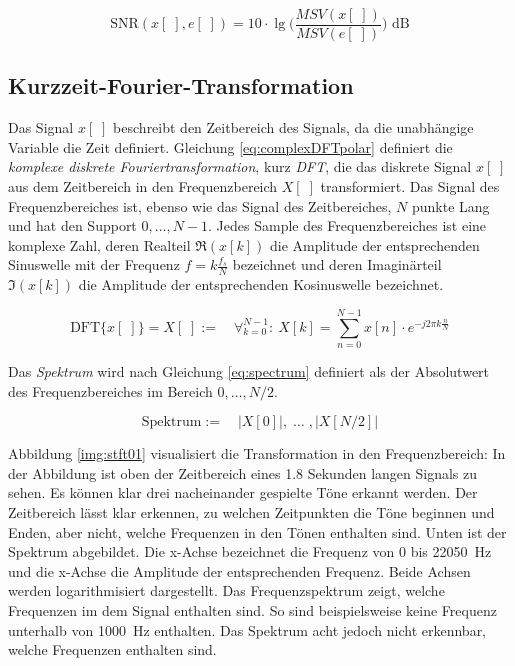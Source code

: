 \begin{equation}
\text{SNR}(x[\;],e[\;]) = 10 \cdot  \lg \Big(\frac{MSV(x[\;])}{MSV(e[\;])} \Big) \text{ dB}
\label{eq:snrDb}
\end{equation}

\subsection{Kurzzeit-Fourier-Transformation}
\label{sec:stft}

Das Signal $x[\;]$ beschreibt den Zeitbereich des Signals, da die unabhängige Variable die Zeit definiert. Gleichung \ref{eq:complexDFTpolar} definiert die \emph{komplexe diskrete Fouriertransformation}, kurz \emph{DFT}, die das diskrete Signal $x[\;]$ aus dem Zeitbereich in den Frequenzbereich $X[\;]$ transformiert. Das Signal des Frequenzbereiches ist, ebenso wie das Signal des Zeitbereiches, $N$ punkte Lang und hat den Support $0 , \ldots , N-1$. Jedes Sample des Frequenzbereiches ist eine komplexe Zahl, deren Realteil $\Re(x[k])$ die Amplitude der entsprechenden Sinuswelle mit der Frequenz $f = k\frac{f_s}{N}$ bezeichnet und deren Imaginärteil  $\Im(x[k])$ die Amplitude der entsprechenden Kosinuswelle bezeichnet.\cite[S. 149, S. 567 - 571]{dspGuide} \cite[S. 60]{sprachverarbeitung}

\begin{equation}
\label{eq:complexDFTpolar}
\text{DFT}\{x[\;]\} = X[\;]  := \quad \mathop{\forall}_{k = 0}^{N-1} :\ X[k] =  \sum_{n = 0}^{N-1}  x[n] \cdot e^{-j 2\pi k \frac{n}{N}}
\end{equation}

Das \emph{Spektrum} wird nach Gleichung \ref{eq:spectrum} definiert als der Absolutwert des Frequenzbereiches im Bereich $0, \ldots , N/2$.

\begin{equation}
\label{eq:spectrum}
\text{Spektrum} := \quad |X[0]| , \; \ldots \; , |X[N/2]|
\end{equation}

Abbildung \ref{img:stft01} visualisiert die Transformation in den Frequenzbereich: In der Abbildung ist oben der Zeitbereich eines 1.8 Sekunden langen Signals zu sehen. Es können klar drei nacheinander gespielte Töne erkannt werden. Der Zeitbereich lässt klar erkennen, zu welchen Zeitpunkten die Töne beginnen und Enden, aber nicht, welche Frequenzen in den Tönen enthalten sind. Unten ist der Spektrum abgebildet. Die x-Achse bezeichnet die Frequenz von 0 bis \SI{22050}{\hertz} und die x-Achse die Amplitude der entsprechenden Frequenz. Beide Achsen werden logarithmisiert dargestellt. Das Frequenzspektrum zeigt, welche Frequenzen im dem Signal enthalten sind. So sind beispielsweise keine Frequenz unterhalb von \SI{1000}{\hertz} enthalten. Das Spektrum acht jedoch nicht erkennbar, welche Frequenzen enthalten sind.

